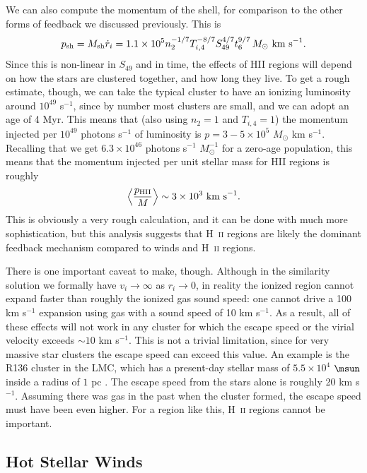 We can also compute the momentum of the shell, for comparison to the other forms of feedback we discussed previously. This is
\begin{equation}
p_{\rm sh} = M_{\rm sh} \dot{r}_i = 1.1\times 10^5 n_2^{-1/7} T_{i,4}^{-8/7} S_{49}^{4/7} t_6^{9/7} \, M_\odot\mbox{ km s}^{-1}.
\end{equation}
Since this is non-linear in $S_{49}$ and in time, the effects of HII regions will depend on how the stars are clustered together, and how long they live. To get a rough estimate, though, we can take the typical cluster to have an ionizing luminosity around $10^{49}$ s$^{-1}$, since by number most clusters are small, and we can adopt an age of 4 Myr. This means that (also using $n_2 = 1$ and $T_{i,4} = 1$) the momentum injected per $10^{49}$ photons s$^{-1}$ of luminosity is $p = 3-5\times 10^5$ $M_\odot$ km s$^{-1}$. Recalling that we get $6.3\times 10^{46}$ photons s$^{-1}$ $M_\odot^{-1}$ for a zero-age population, this means that the momentum injected per unit stellar mass for HII regions is roughly
\begin{equation}
\left\langle\frac{p_{\rm HII}}{M}\right\rangle \sim 3\times 10^3\mbox{ km s}^{-1}.
\end{equation}
This is obviously a very rough calculation, and it can be done with much more sophistication, but this analysis suggests that H~\textsc{ii} regions are likely the dominant feedback mechanism compared to winds and H~\textsc{ii} regions.

There is one important caveat to make, though. Although in the similarity solution we formally have $v_i \rightarrow \infty$ as $r_i \rightarrow 0$, in reality the ionized region cannot expand faster than roughly the ionized gas sound speed: one cannot drive a 100 km s$^{-1}$ expansion using gas with a sound speed of 10 km s$^{-1}$. As a result, all of these effects will not work in any cluster for which the escape speed or the virial velocity exceeds $\sim 10$ km s$^{-1}$. This is not a trivial limitation, since for very massive star clusters the escape speed can exceed this value. An example is the R136 cluster in the LMC, which has a present-day stellar mass of $5.5\times 10^4$ $\msun$ inside a radius of $1$ pc \citep{hunter96a}. The escape speed from the stars alone is roughly 20 km s$^{-1}$. Assuming there was gas in the past when the cluster formed, the escape speed must have been even higher. For a region like this, H~\textsc{ii} regions cannot be important.

\subsection{Hot Stellar Winds}

